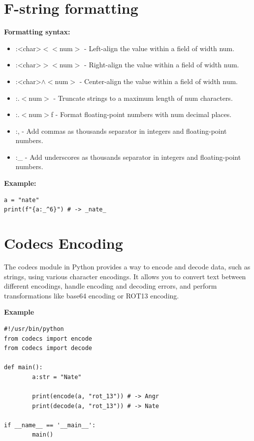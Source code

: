 \documentclass{report}
\begin{document}
    \section{F-string formatting}
    \textbf{Formatting syntax:}
    \begin{itemize}
        \item :<char>$<$$<$num$>$ - Left-align the value within a field of width num.
        \item :<char>$>$$<$num$>$ - Right-align the value within a field of width num.
        \item :<char>$\wedge$$<$num$>$ - Center-align the value within a field of width num.
        \item :.$<$num$>$ - Truncate strings to a maximum length of num characters.
        \item :.$<$num$>$f - Format floating-point numbers with num decimal places.
        \item :, - Add commas as thousands separator in integers and floating-point numbers.
        \item :\_ - Add underscores as thousands separator in integers and floating-point numbers.
    \end{itemize}
    \bigbreak \noindent 
    \begin{mdframed}
      \textbf{Example: }
      \begin{verbatim}
a = "nate"
print(f"{a:_^6}") # -> _nate_
      \end{verbatim}
      
    \end{mdframed}
    \pagebreak \bigbreak \noindent
    \section{Codecs Encoding}
    \bigbreak \noindent 
    The codecs module in Python provides a way to encode and decode data, such as strings, using various character encodings. It allows you to convert text between different encodings, handle encoding and decoding errors, and perform transformations like base64 encoding or ROT13 encoding.
    \bigbreak \noindent 
    \begin{mdframed}
        \textbf{Example}
        \begin{verbatim}
#!/usr/bin/python
from codecs import encode
from codecs import decode

def main():
        a:str = "Nate"

        print(encode(a, "rot_13")) # -> Angr
        print(decode(a, "rot_13")) # -> Nate

if __name__ == '__main__':
        main()

        \end{verbatim}
    \end{mdframed}
\end{document}
